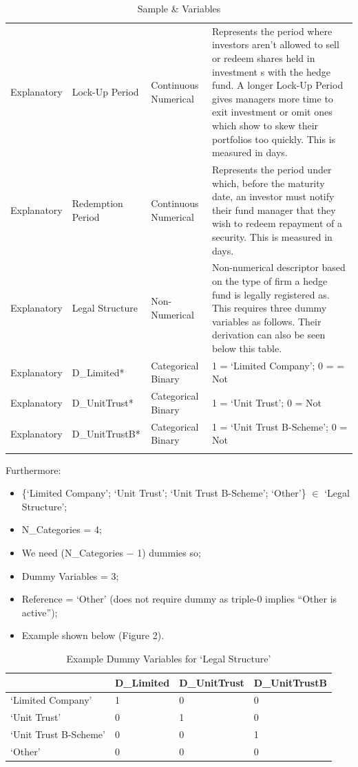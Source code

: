 \documentclass[11pt, english]{article}
\begin{document}
\begin{center}
\begin{longtable}{p{2cm}p{3cm}p{3cm}p{5cm}}
		Explanatory & Lock-Up Period & Continuous Numerical & \tiny Represents the period where investors aren’t allowed to sell or redeem shares held in investment s with the hedge fund. A longer Lock-Up Period gives managers more time to exit investment or omit ones which show to skew their portfolios too quickly. This is measured in days.\\
		Explanatory & Redemption Period & Continuous Numerical & \tiny Represents the period under which, before the maturity date, an investor must notify their fund manager that they wish to redeem repayment of a security. This is measured in days.\\
		Explanatory & Legal Structure & Non-Numerical & \tiny Non-numerical descriptor based on the type of firm a hedge fund is legally registered as. This requires three dummy variables as follows. Their derivation can also be seen below this table.\\
		Explanatory & D\_Limited* & Categorical Binary & \tiny 1 = `Limited Company'; 0 = = Not\\
		Explanatory & D\_UnitTrust* & Categorical Binary & \tiny 1 = `Unit Trust'; 0 = Not\\
		Explanatory & D\_UnitTrustB* & Categorical Binary & \tiny 1 = `Unit Trust B-Scheme'; 0 = Not\\
		\hline
		\caption{Sample \& Variables}
	\end{longtable}
	\end{center}

	Furthermore:

	\begin{itemize}
		\scriptsize
	\setlength\itemsep{0cm}
		\item \{`Limited Company'; `Unit Trust'; `Unit Trust B-Scheme'; `Other'\} $\in$ `Legal Structure';
		\item N\_Categories = 4;
		\item We need (N\_Categories $-$ 1) dummies so;
		\item Dummy Variables = 3;
		\item Reference = `Other' (does not require dummy as triple-0 implies ``Other is active'');
		\item Example shown below (Figure 2).
	\end{itemize}

	\begin{table}[h]
		\scriptsize
		\renewcommand{\arraystretch}{1.25}
	\begin{center}
	\begin{tabular}{p{3cm}p{3cm}p{3cm}p{3cm}}
		& \textbf{D\_Limited} & \textbf{D\_UnitTrust} & \textbf{D\_UnitTrustB}\\
		\hline
		`Limited Company' & 1 & 0 & 0\\
		`Unit Trust' & 0 & 1 & 0\\ 
		`Unit Trust B-Scheme' & 0 & 0 & 1\\
		`Other' & 0 & 0 & 0\\
		\hline
	\end{tabular}
		\caption{Example Dummy Variables for `Legal Structure'}
	\end{center}
	\end{table}
\end{document}
